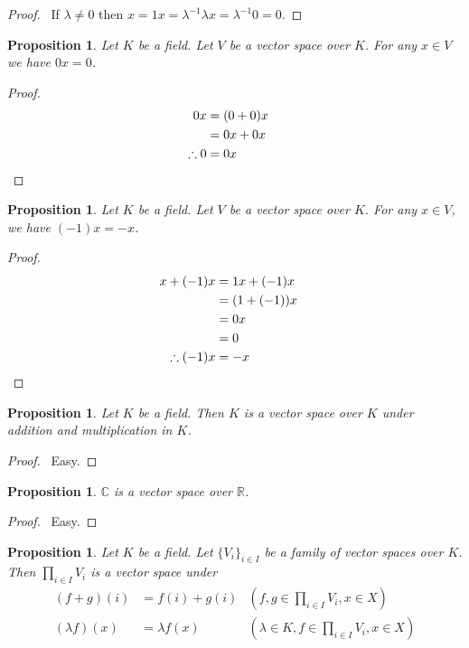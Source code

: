\documentclass{book}
\let\qed\relax
\newtheorem{prop}[ax]{Proposition}
\theoremstyle{definition}
\begin{document}
\begin{proof}
\pf\ If $\lambda \neq 0$ then $x = 1x = \lambda^{-1} \lambda x = \lambda^{-1} 0 = 0$. \qed
\end{proof}

\begin{prop}
\label{prop:zerotimes}
Let $K$ be a field. Let $V$ be a vector space over $K$. For any $x \in V$ we have $0x = 0$.
\end{prop}

\begin{proof}
\pf
\begin{align*}
0x & = (0 + 0) x \\
& = 0x + 0x \\
\therefore 0 & = 0x & \qed
\end{align*}
\end{proof}

\begin{prop}
Let $K$ be a field. Let $V$ be a vector space over $K$. For any $x \in V$, we have $(-1)x = -x$.
\end{prop}

\begin{proof}
\pf
\begin{align*}
x + (-1)x & = 1x + (-1) x \\
& = (1 + (-1))x \\
& = 0 x \\
& = 0 \\
\therefore (-1)x & = -x & \qed
\end{align*}
\end{proof}

\begin{prop}
Let $K$ be a field. Then $K$ is a vector space over $K$ under addition and multiplication in $K$.
\end{prop}

\begin{proof}
\pf\ Easy. \qed
\end{proof}

\begin{prop}
$\mathbb{C}$ is a vector space over $\mathbb{R}$.
\end{prop}

\begin{proof}
\pf\ Easy. \qed
\end{proof}

\begin{prop}
Let $K$ be a field. Let $\{ V_i \}_{i \in I}$ be a family of vector spaces over $K$. Then $\prod_{i \in I} V_i$ is a vector space under
\begin{align*}
(f + g)(i) & = f(i) + g(i) & (f,g \in \prod_{i \in I} V_i, x \in X) \\
(\lambda f)(x) & = \lambda f(x) & (\lambda \in K, f \in \prod_{i \in I} V_i, x \in X)
\end{align*}
\end{prop}
\end{document}
